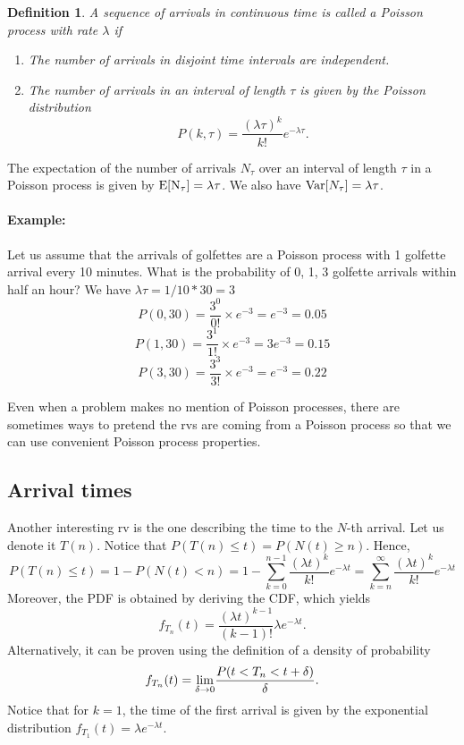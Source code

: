 \documentclass[12pt,a4paper]{article}
\newtheorem{definition}{Definition}
\begin{document}
\begin{definition}
	A sequence of arrivals in continuous time is called a Poisson process with rate $\lambda$ if
	\begin{enumerate}
		\item The number of arrivals in disjoint time intervals are independent.
		\item The number of arrivals in an interval of length $\tau$ is given by the Poisson distribution 
		$$
		P(k,\tau) = \frac{(\lambda\tau)^k}{k!}e^{-\lambda\tau}.
		$$
	\end{enumerate}
\end{definition}
The expectation of the number of arrivals $N_\tau$ over an interval of length $\tau$ in a Poisson process is given by $\rm E[N_\tau] = \lambda\tau$.
We also have ${\rm Var}[N_\tau] = \lambda\tau$.

\paragraph{Example: }
Let us assume that the arrivals of golfettes are a Poisson process with 1 golfette arrival every 10 minutes. 
What is the probability of 0, 1, 3 golfette arrivals within half an hour? We have $\lambda \tau = 1/10*30 = 3$
$$
P(0,30) = \frac{3^0}{0!}\times e^{-3} = e^{-3} = 0.05
$$
$$
P(1,30) = \frac{3^1}{1!}\times e^{-3} = 3e^{-3} = 0.15
$$
$$
P(3,30) = \frac{3^3}{3!}\times e^{-3} = e^{-3} = 0.22
$$

Even when a problem makes no mention of Poisson processes, there are sometimes ways to pretend the rvs are coming from a Poisson
process so that we can use convenient Poisson process properties.

\subsection{Arrival times}
Another interesting rv is the one describing the time to the $N$-th arrival. 
Let us denote it $T(n)$.
Notice that $P(T(n)\leq t) = P(N(t)\geq n)$.
Hence, 
\begin{equation}
	P(T(n)\leq t) = 1 - P(N(t)< n) = 1-\sum_{k = 0}^{n-1} \frac{(\lambda t)^k}{k!}e^{-\lambda t}
	= \sum_{k = n}^\infty \frac{(\lambda t)^k}{k!}e^{-\lambda t}
\end{equation}
Moreover, the PDF is obtained by deriving the CDF, which yields
\begin{equation}
	f_{T_n}(t) = \frac{(\lambda t)^{k-1}}{(k-1)!}\lambda e^{-\lambda t}.
\end{equation}
Alternatively, it can be proven using the definition of a density of probability
\begin{equation}
f_{T_n}(t) = \underset{\delta\rightarrow 0}{\rm lim} \frac{P(t<T_n<t+\delta)}{\delta}.
\end{equation}
Notice that for $k=1$, the time of the first arrival is given by the exponential distribution  $f_{T_1}(t) = \lambda e^{-\lambda t}$.
\end{document}
